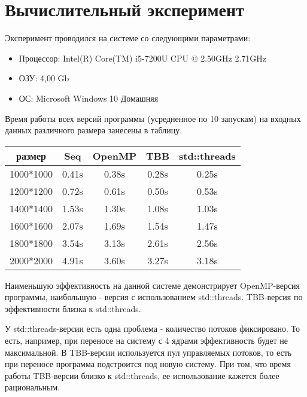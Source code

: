 \documentclass{report}
\begin{document}
\section*{Вычислительный эксперимент}
Эксперимент проводился на системе со следующими параметрами:
\begin{itemize}
\item Процессор: Intel(R) Core(TM) i5-7200U CPU @ 2.50GHz 2.71GHz
\item ОЗУ: 4,00 Gb
\item ОС: Microsoft Windows 10 Домашняя
\end{itemize}
\par Время работы всех версий программы (усредненное по 10 запускам) на входных данных различного размера занесены в таблицу.
\begin{center}
	\begin{tabular} {| c | c  c  c  c |}
		\hline
		размер & Seq & OpenMP & TBB & std::threads \\
		\hline
		1000*1000 & 0.41s & 0.38s & 0.28s & 0.25s \\
		1200*1200 & 0.72s & 0.61s & 0.50s & 0.53s \\
		1400*1400 & 1.53s & 1.30s & 1.08s & 1.03s \\
		1600*1600 & 2.07s & 1.69s & 1.54s & 1.47s \\
		1800*1800 & 3.54s & 3.13s & 2.61s & 2.56s \\
		2000*2000 & 4.91s & 3.60s & 3.27s & 3.18s \\
		\hline
	\end{tabular}
\end{center}
\par Наименьшую эффективность на данной системе демонстрирует OpenMP-версия программы, наибольшую - версия с использованием std::threads. TBB-версия по эффективности близка к std::threads.
\par У std::threads-версии есть одна проблема - количество потоков фиксировано. То есть, например, при переносе на систему с 4 ядрами эффективность будет не максимальной. В TBB-версии используется пул управляемых потоков, то есть при переносе программа подстроится под новую систему. При том, что время работы TBB-версии близко к std::threads, ее использование кажется более рациональным.

\newpage
\end{document}
